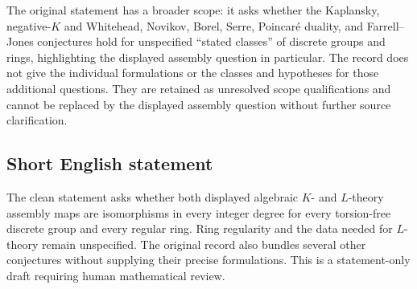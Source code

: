\documentclass[11pt]{article}
\begin{document}
The original statement has a broader scope: it asks whether the Kaplansky, negative-\(K\) and Whitehead, Novikov, Borel, Serre, Poincar\'e duality, and Farrell--Jones conjectures hold for unspecified ``stated classes'' of discrete groups and rings, highlighting the displayed assembly question in particular. The record does not give the individual formulations or the classes and hypotheses for those additional questions. They are retained as unresolved scope qualifications and cannot be replaced by the displayed assembly question without further source clarification.
\subsection{Short English statement}
The clean statement asks whether both displayed algebraic \(K\)- and \(L\)-theory assembly maps are isomorphisms in every integer degree for every torsion-free discrete group and every regular ring. Ring regularity and the data needed for \(L\)-theory remain unspecified. The original record also bundles several other conjectures without supplying their precise formulations. This is a statement-only draft requiring human mathematical review.
\end{document}

